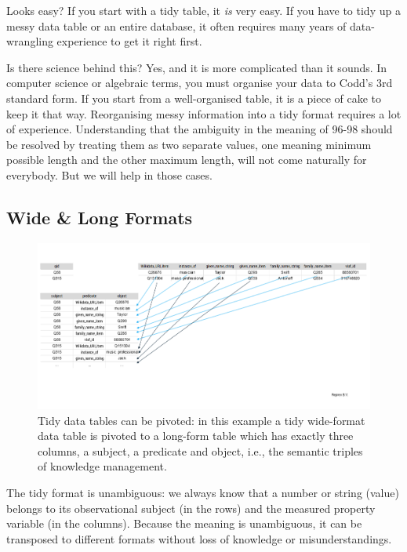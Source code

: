 \documentclass[
  letterpaper,
  DIV=11,
  numbers=noendperiod]{scrreprt}
\begin{document}
Looks easy? If you start with a tidy table, it \emph{is} very easy. If
you have to tidy up a messy data table or an entire database, it often
requires many years of data-wrangling experience to get it right first.

Is there science behind this? Yes, and it is more complicated than it
sounds. In computer science or algebraic terms, you must organise your
data to Codd's 3rd standard form. If you start from a well-organised
table, it is a piece of cake to keep it that way. Reorganising messy
information into a tidy format requires a lot of experience.
Understanding that the ambiguity in the meaning of 96-98 should be
resolved by treating them as two separate values, one meaning minimum
possible length and the other maximum length, will not come naturally
for everybody. But we will help in those cases.

\subsection{Wide \& Long Formats}\label{wide-long-formats}

\begin{figure}[H]

{\centering \includegraphics{png/tidy/pivot_longer_to_statements_notitle_2x1.png}

}

\caption{Tidy data tables can be pivoted: in this example a tidy
wide-format data table is pivoted to a long-form table which has exactly
three columns, a subject, a predicate and object, i.e., the semantic
triples of knowledge management.}

\end{figure}%

The tidy format is unambiguous: we always know that a number or string
(value) belongs to its observational subject (in the rows) and the
measured property variable (in the columns). Because the meaning is
unambiguous, it can be transposed to different formats without loss of
knowledge or misunderstandings.
\end{document}
